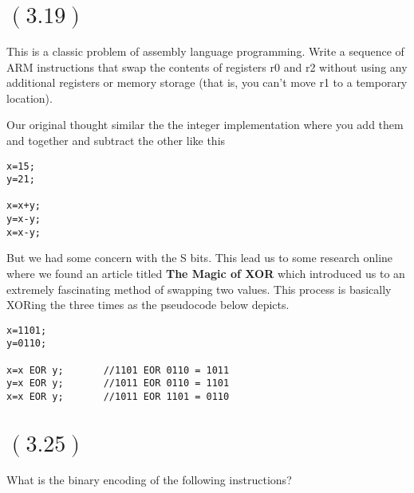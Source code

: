 \documentclass[letterpaper,12pt,titlepage]{article}
\begin{document}
\newpage

\section*{$(3.19)$} This is a classic problem of assembly language programming. Write a sequence of ARM instructions that swap the contents of registers r0 and r2 without using any additional registers or memory storage (that is, you can't move r1 to a temporary location).
\begin{mdframed}[style=MyFrame]
Our original thought similar the the integer implementation where you add them and together and subtract the other like this
\begin{verbatim}
x=15;
y=21;

x=x+y;
y=x-y;
x=x-y;
\end{verbatim}
But we had some concern with the S bits. This lead us to some research online where we found an article titled \textbf{The Magic of XOR} \cite{Charles} which introduced us to an extremely fascinating method of swapping two values. This process is basically XORing the three times as the pseudocode below depicts.
\begin{verbatim}
x=1101;
y=0110;

x=x EOR y;       //1101 EOR 0110 = 1011
y=x EOR y;       //1011 EOR 0110 = 1101
x=x EOR y;       //1011 EOR 1101 = 0110
\end{verbatim}
\vspace{-0.5cm}
\end{mdframed}

\newpage
\section*{$(3.25)$} What is the binary encoding of the following instructions?
\end{document}
